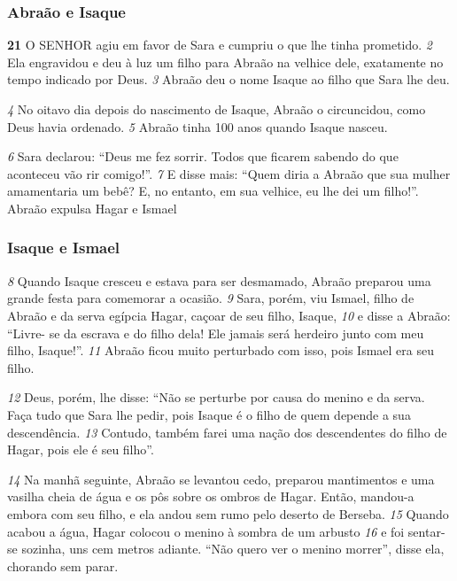 \bigskip   
\subsubsection*{Abraão e Isaque}
\textbf{\large 21}
 O SENHOR agiu em favor de Sara e cumpriu o que lhe tinha prometido. 
\textit{\tiny 2}
Ela
engravidou e deu à luz um filho para Abraão na velhice dele, exatamente no
tempo indicado por Deus. 
\textit{\tiny 3}
Abraão deu o nome Isaque ao filho que Sara lhe deu.

\bigskip   
\textit{\tiny 4}
No oitavo dia depois do nascimento de Isaque, Abraão o circuncidou, como Deus
havia ordenado. 
\textit{\tiny 5}
Abraão tinha 100 anos quando Isaque nasceu.

\bigskip   
\textit{\tiny 6}
Sara declarou: “Deus me fez sorrir. Todos que ficarem sabendo do que
aconteceu vão rir comigo!”. 
\textit{\tiny 7}
E disse mais: “Quem diria a Abraão que sua mulher
amamentaria um bebê? E, no entanto, em sua velhice, eu lhe dei um filho!”.
Abraão expulsa Hagar e Ismael

\bigskip   
\subsubsection*{Isaque e Ismael}
\textit{\tiny 8}
Quando Isaque cresceu e estava para ser desmamado, Abraão preparou uma
grande festa para comemorar a ocasião. 
\textit{\tiny 9}
Sara, porém, viu Ismael, filho de Abraão
e da serva egípcia Hagar, caçoar de seu filho, Isaque,
\textit{\tiny 10}
e disse a Abraão: “Livre-
se da escrava e do filho dela! Ele jamais será herdeiro junto com meu filho,
Isaque!”.
\textit{\tiny 11}
Abraão ficou muito perturbado com isso, pois Ismael era seu filho. 

\bigskip   
\textit{\tiny 12}
Deus,
porém, lhe disse: “Não se perturbe por causa do menino e da serva. Faça tudo que
Sara lhe pedir, pois Isaque é o filho de quem depende a sua descendência.
\textit{\tiny 13}
Contudo, também farei uma nação dos descendentes do filho de Hagar, pois ele
é seu filho”.

\bigskip   
\textit{\tiny 14}
Na  manhã seguinte, Abraão se levantou cedo, preparou mantimentos e uma
vasilha cheia de água e os pôs sobre os ombros de Hagar. Então, mandou-a
embora com seu filho, e ela andou sem rumo pelo deserto de Berseba.
\textit{\tiny 15}
Quando acabou a água, Hagar colocou o menino à sombra de um arbusto 
\textit{\tiny 16}
e
foi sentar-se sozinha, uns cem metros adiante. “Não quero ver o menino
morrer”, disse ela, chorando sem parar.

